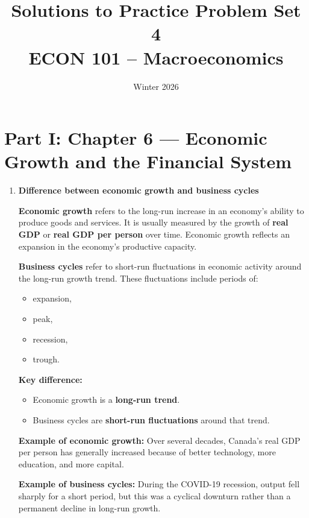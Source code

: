 \documentclass[12pt]{article}
\title{Solutions to Practice Problem Set 4\\ \vspace{10pt} \large ECON 101 -- Macroeconomics}
\author{}
\date{Winter 2026}
\begin{document}
\maketitle

\section*{Part I: Chapter 6 — Economic Growth and the Financial System}

\begin{enumerate}[label=\textbf{\arabic*.}]

\item \textbf{Difference between economic growth and business cycles}

\textbf{Economic growth} refers to the long-run increase in an economy's ability to produce goods and services. It is usually measured by the growth of \textbf{real GDP} or \textbf{real GDP per person} over time. Economic growth reflects an expansion in the economy's productive capacity.

\textbf{Business cycles} refer to short-run fluctuations in economic activity around the long-run growth trend. These fluctuations include periods of:
\begin{itemize}
    \item expansion,
    \item peak,
    \item recession,
    \item trough.
\end{itemize}

\textbf{Key difference:}
\begin{itemize}
    \item Economic growth is a \textbf{long-run trend}.
    \item Business cycles are \textbf{short-run fluctuations} around that trend.
\end{itemize}

\textbf{Example of economic growth:} Over several decades, Canada's real GDP per person has generally increased because of better technology, more education, and more capital.

\textbf{Example of business cycles:} During the COVID-19 recession, output fell sharply for a short period, but this was a cyclical downturn rather than a permanent decline in long-run growth.

\vspace{0.5em}


\end{enumerate}
\end{document}
